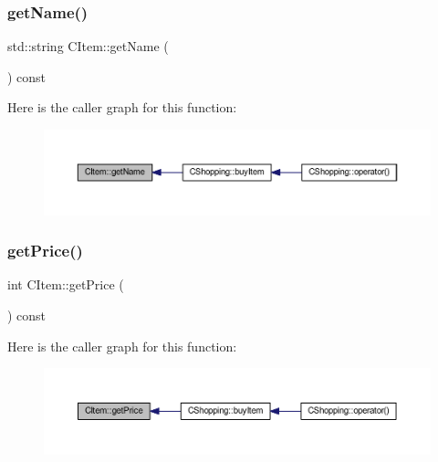 \subsubsection{\texorpdfstring{get\+Name()}{getName()}}
{\footnotesize\ttfamily std\+::string C\+Item\+::get\+Name (\begin{DoxyParamCaption}{ }\end{DoxyParamCaption}) const\hspace{0.3cm}{\ttfamily [inline]}}

Here is the caller graph for this function\+:\nopagebreak
\begin{figure}[H]
\begin{center}
\leavevmode
\includegraphics[width=350pt]{class_c_item_a4287076827e954d45cfa45a7bcc10999_icgraph}
\end{center}
\end{figure}
\mbox{\label{class_c_item_ac4e9e3fe8b7110d7e89098fdc9cfe611}} 
\subsubsection{\texorpdfstring{get\+Price()}{getPrice()}}
{\footnotesize\ttfamily int C\+Item\+::get\+Price (\begin{DoxyParamCaption}{ }\end{DoxyParamCaption}) const\hspace{0.3cm}{\ttfamily [inline]}}

Here is the caller graph for this function\+:\nopagebreak
\begin{figure}[H]
\begin{center}
\leavevmode
\includegraphics[width=350pt]{class_c_item_ac4e9e3fe8b7110d7e89098fdc9cfe611_icgraph}
\end{center}
\end{figure}
\mbox{\label{class_c_item_af35b9c64f05a8377298505b3a81bcd18}} 

